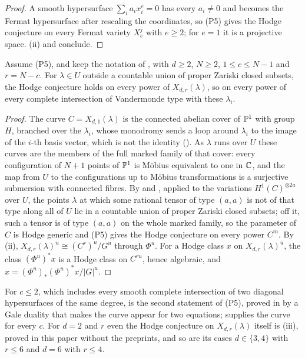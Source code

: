 \begin{proof}
A smooth hypersurface $\sum_{i}a_{i}x_{i}^{e}=0$ has every $a_{i}\ne0$ and
becomes the Fermat hypersurface after rescaling the coordinates, so (P5)
gives the Hodge conjecture on every Fermat variety $X^{j}_{e}$ with $e\ge2$;
for $e=1$ it is a projective space. (ii) and
 conclude.
\end{proof}

\begin{corollary}
\label{cor:vgalldegrees}
Assume \textup{(P5)}, and keep the notation of , with
$d\ge2$, $N\ge2$, $1\le c\le N-1$ and $r=N-c$. For $\lambda\in U$ outside a
countable union of proper Zariski closed subsets, the Hodge conjecture holds
on every power of $X_{d,r}(\lambda)$, so on every power of every complete
intersection of Vandermonde type with these $\lambda_{i}$.
\end{corollary}

\begin{proof}
The curve $C=X_{d,1}(\lambda)$ is the connected abelian cover of $\mathbb{P}^{1}$
with group $H$, branched over the $\lambda_{i}$, whose monodromy sends a loop
around $\lambda_{i}$ to the image of the $i$-th basis vector, which is not
the identity (). As $\lambda$ runs over $U$ these
curves are the members of the full marked family of that cover: every
configuration of $N+1$ points of $\mathbb{P}^{1}$ is M\"obius equivalent to one in
$\mathbb{C}$, and the map from $U$ to the configurations up to M\"obius
transformations is a surjective submersion with connected fibres. By
 and , applied to the variations
$H^{1}(C)^{\otimes2a}$ over $U$, the points $\lambda$ at which some rational
tensor of type $(a,a)$ is not of that type along all of $U$ lie in a
countable union of proper Zariski closed subsets; off it, such a tensor is
of type $(a,a)$ on the whole marked family, so the parameter of $C$ is
Hodge generic and (P5) gives the Hodge conjecture on every power $C^{m}$. By
(ii), $X_{d,r}(\lambda)^{u}\cong(C^{r})^{u}/G^{u}$
through $\Phi^{u}$. For a Hodge class $x$ on $X_{d,r}(\lambda)^{u}$, the class
$(\Phi^{u})^{*}x$ is a Hodge class on $C^{ru}$, hence algebraic, and
$x=(\Phi^{u})_{*}(\Phi^{u})^{*}x/|G|^{u}$.
\end{proof}

For $c\le2$, which includes every smooth complete intersection of two
diagonal hypersurfaces of the same degree,  is the
second statement of (P5), proved in \cite{OAI26a} by a Gale duality that
makes the curve appear for two equations;  supplies
the curve for every $c$. For $d=2$ and $r$ even the Hodge conjecture
on $X_{d,r}(\lambda)$ itself is (iii), proved in
this paper without the preprints, and so are its cases $d\in\{3,4\}$ with
$r\le6$ and $d=6$ with $r\le4$.

